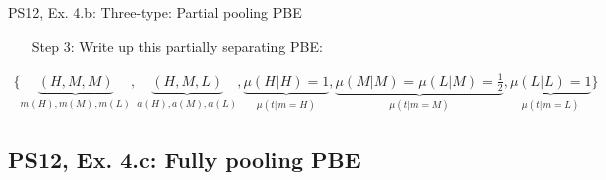 \begin{frame}{PS12, Ex. 4.b: Three-type: Partial pooling PBE}
    \begin{itemize}
      \item[Step 3:] Write up this partially separating PBE:
    \end{itemize}\vspace{-10pt}
    \begin{align*}
      \{\underbrace{(H,M,M)}_{m(H),m(M),m(L)},\underbrace{(H,M,L)}_{a(H),a(M),a(L)},\underbrace{\mu(H|H)=1}_{\mu(t|m=H)},\underbrace{\mu(M|M)=\mu(L|M)=\frac{1}{2}}_{\mu(t|m=M)},\underbrace{\mu(L|L)=1}_{\mu(t|m=L)}\}
    \end{align*}
    \vfill\null
\end{frame}


\subsection{PS12, Ex. 4.c: Fully pooling PBE}

